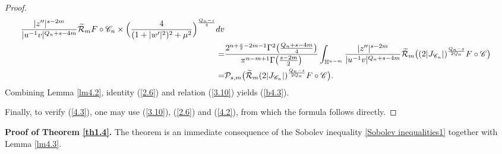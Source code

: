 \documentclass[12pt,reqno]{amsart}%
\theoremstyle{plain}
\numberwithin{equation}{section}
\begin{document}
\begin{proof}
\begin{align}
\frac{|z''|^{s-2m}}{|u^{-1}v|^{Q_n+s-4m}}
\widetilde{\mathcal{R}}_{m}F\circ\mathscr{C}_{n}\times
\Bigl(\frac{4}{(1+|w'|^{2})^{2}+\mu^2}\Bigr)^{\frac{Q_n-s}{4}} dv\\
\nonumber
=& \frac{2^{n+\frac{s}{2}-2m-1}\Gamma^{2}\bigl(\frac{Q_n+s-4m}{4}\bigr)}
{\pi^{n-m+1}\Gamma\bigl(\frac{s-2m}{2}\bigr)}
\int_{\mathbb{H}^{n-m}}
\frac{|z''|^{s-2m}}{|u^{-1}v|^{Q_n+s-4m}}
\widetilde{\mathcal{R}}_{m}\bigl((2|J_{\mathscr{C}_n}|)^{\frac{Q_n-s}{2Q_n}}F\circ\mathscr{C}\bigr)\\
\label{3.10}
=& \mathcal{P}_{s,m}\bigl(\widetilde{\mathcal{R}}_{m}(2|J_{\mathscr{C}_n}|)^{\frac{Q_n-s}{2Q_n}}F\circ\mathscr{C}\bigr).
\end{align}
Combining Lemma \ref{lm4.2}, identity (\ref{2.6}) and relation (\ref{3.10}) yields (\ref{b4.3}).

Finally, to verify (\ref{4.3}), one may use (\ref{3.10}), (\ref{2.6}) and (\ref{4.2}), from which the formula follows directly.
\end{proof}

\textbf{Proof of Theorem \ref{th1.4}.} The theorem is an immediate consequence of the Sobolev inequality \eqref{Sobolev inequalities1} together with Lemma \ref{lm4.3}.

\vspace{0.2cm}
\end{document}
